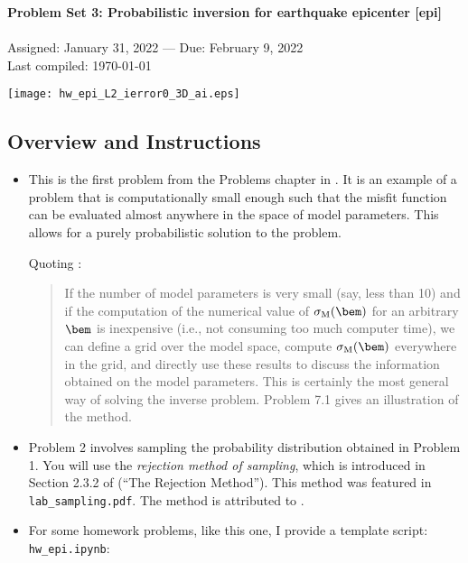 \documentclass[11pt,titlepage,fleqn]{article}
\begin{document}

\begin{center}

{\large \bf Problem Set 3: Probabilistic inversion for earthquake epicenter [epi]} \\
\cltag\ \\
Assigned: January 31, 2022 --- Due: February 9, 2022 \\
Last compiled: \today

\texttt{[image: hw\_epi\_L2\_ierror0\_3D\_ai.eps]}
\end{center}


\subsection*{Overview and Instructions}

\begin{itemize}
\item This is the first problem from the Problems chapter in \citet{Tarantola2005}. It is an example of a problem that is computationally small enough such that the misfit function can be evaluated almost anywhere in the space of model parameters. This allows for a purely probabilistic solution to the problem.

Quoting \citet[][p.~38]{Tarantola2005}:
\begin{quote}
If the number of model parameters is very small (say, less than 10) and if the computation of the numerical value of $\sigma_{\rm M}(\bem)$ for an arbitrary $\bem$ is inexpensive (i.e., not consuming too much computer time), we can define a grid over the model space, compute $\sigma_{\rm M}(\bem)$ everywhere in the grid, and directly use these results to discuss the information obtained on the model parameters. This is certainly the most general way of solving the inverse problem. Problem 7.1 gives an illustration of the method.
\end{quote}

\item Problem 2 involves sampling the probability distribution obtained in Problem 1. You will use the {\em rejection method of sampling}, which is introduced in Section 2.3.2 of \citet{Tarantola2005} (``The Rejection Method''). This method was featured in \verb+lab_sampling.pdf+. The method is attributed to \citet{vonNeumann1951}.

\item For some homework problems, like this one, I provide a template script: \verb+hw_epi.ipynb+:
%
\end{itemize}
\end{document}
